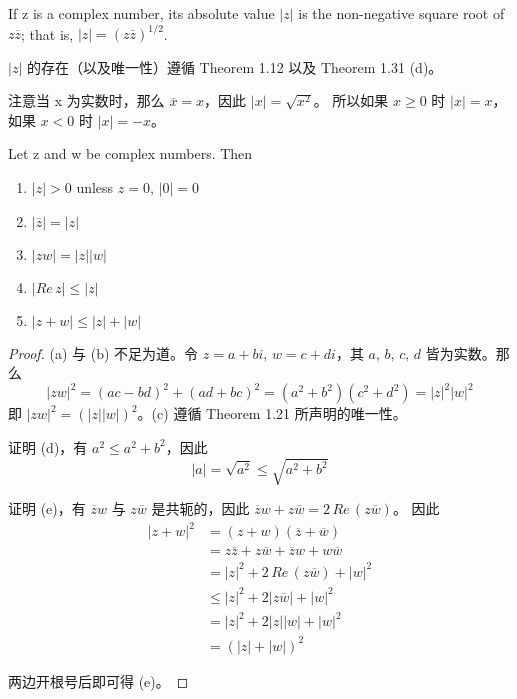 \documentclass[../poma-notes.tex]{subfiles}
\begin{document}
\begin{definition}
	If z is a complex number, its absolute value $|z|$ is the non-negative square root of $z\overline{z}$;
	that is, $|z| = (z\overline{z})^{1/2}$.
\end{definition}

$|z|$ 的存在（以及唯一性）遵循 Theorem 1.12 以及 Theorem 1.31 (d)。

注意当 x 为实数时，那么 $\overline{x} = x$，因此 $|x| = \sqrt{x^2}$。
所以如果 $x \ge 0$ 时 $|x| = x$，如果 $x<0$ 时 $|x| = -x$。

\begin{theorem}
	Let z and w be complex numbers. Then
	\begin{enumerate}[label=(\alph*)]
		\item $|z|>0$ unless $z=0,\,|0|=0$
		\item $|\overline{z}|=|z|$
		\item $|zw|=|z||w|$
		\item $|Re \, z| \le |z|$
		\item $|z+w| \le |z|+|w|$
	\end{enumerate}
\end{theorem}

\begin{proof}
	(a) 与 (b) 不足为道。令 $z=a+bi,\,w=c+di$，其 $a,\,b,\,c,\,d$ 皆为实数。那么
	\[|zw|^2 = (ac-bd)^2 + (ad+bc)^2 = (a^2+b^2)(c^2+d^2) = |z|^2|w|^2\]
	即 $|zw|^2 = (|z||w|)^2$。(c) 遵循 Theorem 1.21 所声明的唯一性。

	证明 (d)，有 $a^2 \le a^2 + b^2$，因此
	\[|a| = \sqrt{a^2} \le \sqrt{a^2 + b^2}\]

	证明 (e)，有 $\overline{z}w$ 与 $z\overline{w}$ 是共轭的，因此 $\overline{z}w + z\overline{w} = 2\, Re\,(z\overline{w})$。
	因此
	\begin{align*}
		\mathcal |z+w|^2 & = (z+w)(\overline{z}+\overline{w})                              \\
		                 & = z\overline{z} + z\overline{w} + \overline{z}w + w\overline{w} \\
		                 & = |z|^2 + 2\,Re\,(z\overline{w}) + |w|^2                        \\
		                 & \le |z|^2 + 2|z\overline{w}| + |w|^2                            \\
		                 & = |z|^2 + 2|z||w| + |w|^2                                       \\
		                 & = (|z|+|w|)^2
	\end{align*}

	两边开根号后即可得 (e)。
\end{proof}
\end{document}
